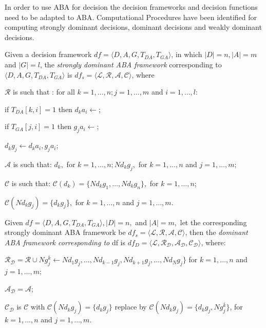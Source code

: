 In order to use ABA for decision the decision frameworks and decision functions need to be adapted to ABA. Computational Procedures have been identified for computing strongly dominant decisions, dominant decisions and weakly dominant decisions.
\newline

\begin{defn} Given a decision framework $df = \langle D, A, G, T_{DA}, T_{GA} \rangle$, in which $|D| = n, |A| = m$ and $|G| = l$, the \emph{strongly dominant ABA framework} corresponding to $\langle D, A, G, T_{DA}, T_{GA} \rangle$ is $df_s = \langle \mathcal{L}, \mathcal{R}, \mathcal{A}, \mathcal{C} \rangle$, where
\begin{itemize*}
\item $\mathcal{R}$ is such that : for all $k=1,\ldots,n;j=1,\ldots,m$ and $i=1,\ldots,l$:
\begin{itemize*}
\item if $T_{DA}[k,i]=1$ then $d_ka_i \leftarrow$;
\item if $T_{GA}[j,i]=1$ then $g_ja_i \leftarrow$;
\item $d_kg_j \leftarrow d_ka_i,g_ja_i$;
\end{itemize*}
\item $\mathcal{A}$ is such that: $d_k,$ for $k=1,\ldots,n;Nd_kg_j,$ for $k=1,\ldots,n$ and $j=1,\ldots,m$;
\item $\mathcal{C}$ is such that: $\mathcal{C}(d_k)=\{Nd_kg_1,\ldots,Nd_kg_n\},$ for $k=1,\ldots,n$;
\end{itemize*}

$\mathcal{C}(Nd_kg_j)=\{d_kg_j\},$ for $k=1,\ldots,n$ and $j=1,\ldots,m$.
\end{defn}

\begin{defn} Given $df=\langle D, A, G, T_{DA}, T_{GA} \rangle, |D|=n,$  and $|A|=m,$ let the corresponding strongly dominant ABA framework be $df_s=\langle \mathcal{L}, \mathcal{R}, \mathcal{A}, \mathcal{C} \rangle$, then the \emph{dominant ABA framework corresponding to} df is $df_D=\langle \mathcal{L}, \mathcal{R_D}, \mathcal{A_D}, \mathcal{C_D} \rangle$, where:
\begin{itemize*}
\item $\mathcal{R_D}=\mathcal{R}\cup Ng_j^{\bar{k}} \leftarrow Nd_1g_j,\ldots, Nd_{k-1}g_j, Nd_{k+1}g_j,\ldots,Nd_Ng_j\}$ for $k=1,\ldots,n$ and $j=1,\ldots,m$;
\item $\mathcal{A_D}=\mathcal{A}$;
\item $\mathcal{C_D}$ is $\mathcal{C}$ with $\mathcal{C}(Nd_kg_j)=\{d_kg_j\}$ replace by $\mathcal{C}(Nd_kg_j)=\{d_kg_j,Ng_j^{\bar{k}}\}$, for $k=1,\ldots,n$ and $j=1,\ldots,m$.
\end{itemize*}
\end{defn}

